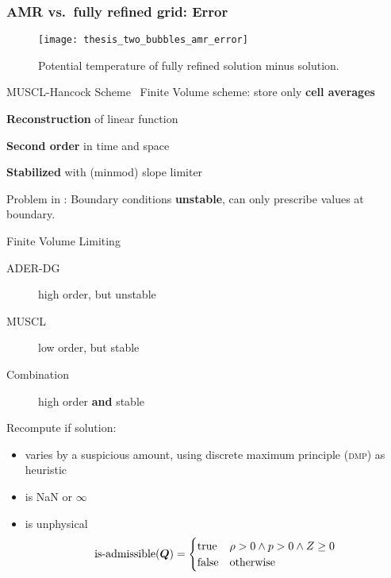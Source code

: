 \documentclass[aspectratio=169]{beamer}
\begin{document}
\begin{frame}
  \frametitle{AMR vs.\ fully refined grid: Error}
  \begin{figure}[H]
    \centering
     {
\texttt{[image: thesis\_two\_bubbles\_amr\_error]}
  }
\caption{Potential temperature of fully refined solution minus \amr{} solution.}
  \end{figure}
\end{frame}

\begin{frame}{MUSCL-Hancock Scheme~}
  Finite Volume scheme: store only \textbf{cell averages}

  \textbf{Reconstruction} of linear function

  \textbf{Second order} in time and space

  \textbf{Stabilized} with (minmod) slope limiter

  Problem in \exahype{}: Boundary conditions \textbf{unstable}, can only prescribe values at boundary.
\end{frame}

\begin{frame}{Finite Volume Limiting}
  \begin{description}
\item[ADER-DG] high order, but unstable
\item[MUSCL] low order, but stable
\item[Combination] high order \textbf{and} stable
  \end{description}

Recompute if solution:
\begin{itemize}
\item varies by a suspicious amount, using discrete maximum principle (\textsc{dmp}) as heuristic
\item is NaN or $\infty$
\item is unphysical
 \begin{equation}
  \label{eq:limiting-physical}
  \operatorname{is-admissible}(\bm{Q}) =
  \begin{cases}
    \text{true} & \rho > 0 \land p > 0 \land Z \geq 0 \\
    \text{false} & \text{otherwise}
  \end{cases}
\end{equation}
\end{itemize}
\end{frame}
\end{document}
